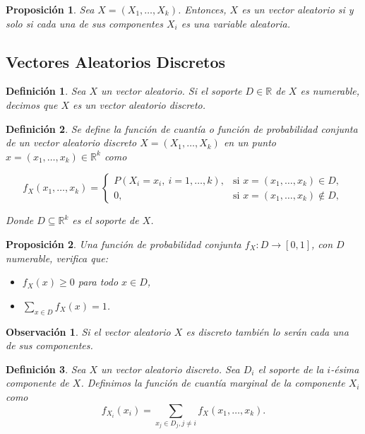 \documentclass{report}
\newtheorem{prop}{Proposición}[section]
\newtheorem{dfn}{Definición}[section]
\newtheorem{obs}{Observación}[section]
\begin{document}
\begin{prop}
Sea \( X = (X_1, \dots, X_k) \). Entonces, \( X \) es un vector aleatorio si y solo si cada una de sus componentes \( X_i \) es una variable aleatoria.
\end{prop}

\subsection{Vectores Aleatorios Discretos}

\begin{dfn}
Sea $X$ un vector aleatorio. Si el soporte $D\in\mathbb{R}$ de $X$ es numerable, decimos que $X$ es un \emph{vector aleatorio discreto}.    
\end{dfn}

\begin{dfn}
Se define la \textit{función de cuantía} o \textit{función de probabilidad conjunta} de un vector aleatorio discreto 
\( X = (X_1, \dots, X_k) \) en un punto \( x = (x_1, \dots, x_k) \in \mathbb{R}^k \) como

\[
f_X(x_1, \dots, x_k) = 
\begin{cases}
P(X_i = x_i, \ i = 1, \dots, k), & \text{si } x = (x_1, \dots, x_k) \in D, \\
0, & \text{si } x = (x_1, \dots, x_k) \notin D, 
\end{cases}
\]

Donde \( D \subseteq \mathbb{R}^k \) es el soporte de \( X \).
\end{dfn}

\begin{prop}
Una función de probabilidad conjunta \( f_X \colon D \to [0,1] \), con $D$ numerable, verifica que:

\begin{itemize}
    \item \( f_X(x) \geq 0 \) para todo \( x \in D \),
    \item \( \displaystyle\sum_{x \in D} f_X(x) = 1 \).
\end{itemize}
\end{prop}

\begin{obs}
    Si el vector aleatorio $X$ es discreto también lo serán cada una de sus componentes.
\end{obs}

\begin{dfn}
    Sea $X$ un vector aleatorio discreto. Sea $D_i$ el soporte de la $i$-ésima componente de $X$. Definimos la función de cuantía marginal de la componente
    $X_i$ como
    \begin{equation*}
        f_{X_i}(x_i) = \sum_{x_j\in D_j, j\neq i} f_X(x_1,\ldots,x_k).
    \end{equation*}
\end{dfn}
\end{document}
